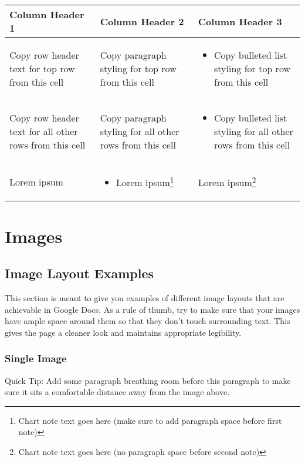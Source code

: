 \documentclass{nyu22report}
\begin{document}
\begin{table}[h]

    \begin{tabularx}{\textwidth}{|X|X|X|}\hline
        Column Header 1
        & Column Header 2
        & Column Header 3
        \\\hline
        Copy row header text for top row from this cell
        & Copy paragraph styling for top row from this cell
        & \begin{itemize} 
            \item Copy bulleted list styling for top row from this cell
          \end{itemize}
        \\\hline
        Copy row header text for all other rows from this cell
        & Copy paragraph styling for all other rows from this cell
        & \begin{itemize}
            \item Copy bulleted list styling for all other rows from this cell
          \end{itemize}
        \\\hline
        Lorem ipsum
        & \begin{itemize}
            \item Lorem ipsum\footnote{Chart note text goes here (make sure to add paragraph space before first note)}
          \end{itemize}
        & Lorem ipsum\footnote{Chart note text goes here (no paragraph space before second note)}
        \\\hline
    \end{tabularx}
\end{table}

\chapter{Images}

\section*{Image Layout Examples}

This section is meant to give you examples of different image layouts that are
achievable in Google Docs. As a rule of thumb, try to make sure that your images
have ample space around them so that they don’t touch surrounding text. This
gives the page a cleaner look and maintains appropriate legibility.

\subsection*{Single Image}

Quick Tip: Add some paragraph breathing room before this paragraph to make sure
it sits a comfortable distance away from the image above. 
\end{document}
